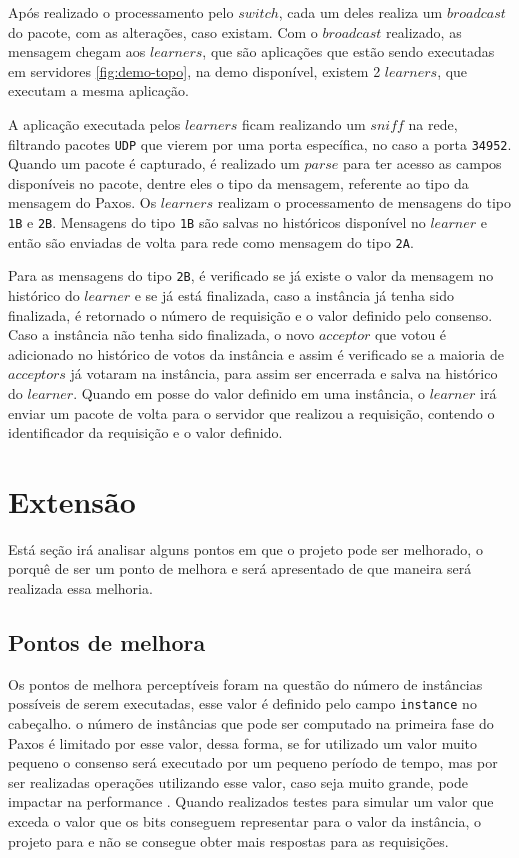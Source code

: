 \documentclass[
    12pt,
    openright, 
    oneside,
    a4paper,
    french,
    english,
    brazil
    ]{facom-ufu-abntex2}
\theoremstyle{definition}
\begin{document}


Após realizado o processamento pelo $switch$, cada um deles realiza um $broadcast$ do pacote,
com as alterações, caso existam. Com o $broadcast$ realizado, as mensagem chegam aos
$learners$, que são aplicações que estão sendo executadas em servidores \ref{fig:demo-topo}, 
na demo disponível, existem 2 $learners$, que executam a mesma aplicação.

A aplicação executada pelos $learners$ ficam realizando um $sniff$ na rede, filtrando pacotes
\texttt{UDP} que vierem por uma porta específica, no caso a porta \texttt{34952}. Quando um
pacote é capturado, é realizado um $parse$ para ter acesso as campos disponíveis no pacote, dentre
eles o tipo da mensagem, referente ao tipo da mensagem do Paxos. Os $learners$ realizam o processamento
de mensagens do tipo \texttt{1B} e \texttt{2B}. Mensagens do tipo \texttt{1B} são salvas no históricos
disponível no $learner$ e então são enviadas de volta para rede como mensagem do tipo \texttt{2A}.

Para as mensagens do tipo \texttt{2B}, é verificado se já existe o valor da mensagem no histórico
do $learner$ e se já está finalizada, caso a instância já tenha sido finalizada, é retornado o
número de requisição e o valor definido pelo consenso. Caso a instância não tenha sido finalizada,
o novo $acceptor$ que votou é adicionado no histórico de votos da instância e assim é verificado
se a maioria de $acceptors$ já votaram na instância, para assim ser encerrada e salva na histórico
do $learner$. Quando em posse do valor definido em uma instância, o $learner$ irá enviar um pacote de 
volta para o servidor que realizou a requisição, contendo o identificador da requisição e o valor definido.

\section{Extensão}
Está seção irá analisar alguns pontos em que o projeto pode ser melhorado, o porquê de ser um ponto de
melhora e será apresentado de que maneira será realizada essa melhoria.

\subsection{Pontos de melhora}
Os pontos de melhora perceptíveis foram na questão do número de instâncias possíveis de serem executadas,
esse valor é definido pelo campo \texttt{instance} no cabeçalho. o número de instâncias que pode ser 
computado na primeira fase do Paxos é limitado por esse valor, dessa forma, se for utilizado um valor
muito pequeno o consenso será executado por um pequeno período de tempo, mas por ser realizadas operações
utilizando esse valor, caso seja muito grande, pode impactar na performance \cite{dang2016paxos}. 
Quando realizados testes para simular um valor que exceda o valor que os bits conseguem representar 
para o valor da instância, o projeto para e não se consegue obter mais respostas para as requisições.
\end{document}
